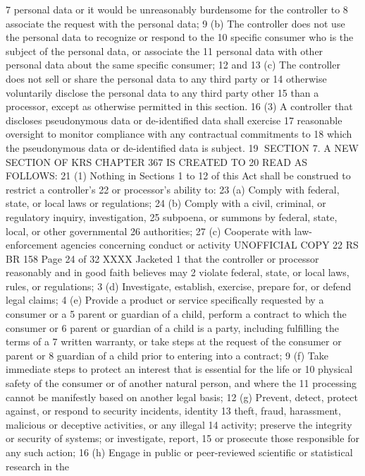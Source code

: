 7 personal data or it would be unreasonably burdensome for the controller to
8 associate the request with the personal data;
9 (b) The controller does not use the personal data to recognize or respond to the
10 specific consumer who is the subject of the personal data, or associate the
11 personal data with other personal data about the same specific consumer;
12 and
13 (c) The controller does not sell or share the personal data to any third party or
14 otherwise voluntarily disclose the personal data to any third party other
15 than a processor, except as otherwise permitted in this section.
16 (3) A controller that discloses pseudonymous data or de-identified data shall exercise
17 reasonable oversight to monitor compliance with any contractual commitments to
18 which the pseudonymous data or de-identified data is subject.
19 SECTION 7. A NEW SECTION OF KRS CHAPTER 367 IS CREATED TO
20 READ AS FOLLOWS:
21 (1) Nothing in Sections 1 to 12 of this Act shall be construed to restrict a controller's
22 or processor's ability to:
23 (a) Comply with federal, state, or local laws or regulations;
24 (b) Comply with a civil, criminal, or regulatory inquiry, investigation,
25 subpoena, or summons by federal, state, local, or other governmental
26 authorities;
27 (c) Cooperate with law-enforcement agencies concerning conduct or activity 
UNOFFICIAL COPY 22 RS BR 158
Page 24 of 32
XXXX Jacketed
1 that the controller or processor reasonably and in good faith believes may
2 violate federal, state, or local laws, rules, or regulations;
3 (d) Investigate, establish, exercise, prepare for, or defend legal claims;
4 (e) Provide a product or service specifically requested by a consumer or a
5 parent or guardian of a child, perform a contract to which the consumer or
6 parent or guardian of a child is a party, including fulfilling the terms of a
7 written warranty, or take steps at the request of the consumer or parent or
8 guardian of a child prior to entering into a contract;
9 (f) Take immediate steps to protect an interest that is essential for the life or
10 physical safety of the consumer or of another natural person, and where the
11 processing cannot be manifestly based on another legal basis;
12 (g) Prevent, detect, protect against, or respond to security incidents, identity
13 theft, fraud, harassment, malicious or deceptive activities, or any illegal
14 activity; preserve the integrity or security of systems; or investigate, report,
15 or prosecute those responsible for any such action;
16 (h) Engage in public or peer-reviewed scientific or statistical research in the
